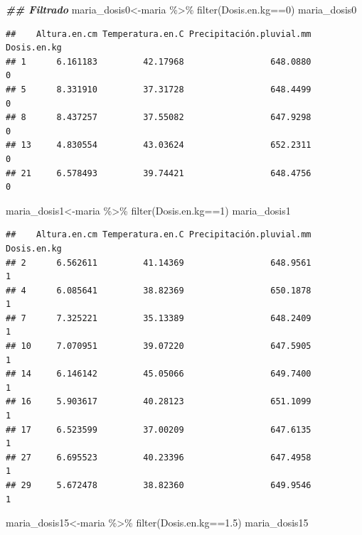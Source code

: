 \documentclass[
]{article}
\newenvironment{Shaded}{\begin{snugshade}}{\end{snugshade}}
\newcommand{\DecValTok}[1]{\textcolor[rgb]{0.00,0.00,0.81}{#1}}
\newcommand{\DocumentationTok}[1]{\textcolor[rgb]{0.56,0.35,0.01}{\textbf{\textit{#1}}}}
\newcommand{\FloatTok}[1]{\textcolor[rgb]{0.00,0.00,0.81}{#1}}
\newcommand{\FunctionTok}[1]{\textcolor[rgb]{0.00,0.00,0.00}{#1}}
\newcommand{\NormalTok}[1]{#1}
\newcommand{\OtherTok}[1]{\textcolor[rgb]{0.56,0.35,0.01}{#1}}
\newcommand{\SpecialCharTok}[1]{\textcolor[rgb]{0.00,0.00,0.00}{#1}}
\begin{document}
\begin{Shaded}
\begin{Highlighting}[]
\DocumentationTok{\#\# Filtrado}
\NormalTok{maria\_dosis0}\OtherTok{\textless{}{-}}\NormalTok{maria }\SpecialCharTok{\%\textgreater{}\%} \FunctionTok{filter}\NormalTok{(Dosis.en.kg}\SpecialCharTok{==}\DecValTok{0}\NormalTok{)}
\NormalTok{maria\_dosis0}
\end{Highlighting}
\end{Shaded}

\begin{verbatim}
##    Altura.en.cm Temperatura.en.C Precipitación.pluvial.mm Dosis.en.kg
## 1      6.161183         42.17968                 648.0880           0
## 5      8.331910         37.31728                 648.4499           0
## 8      8.437257         37.55082                 647.9298           0
## 13     4.830554         43.03624                 652.2311           0
## 21     6.578493         39.74421                 648.4756           0
\end{verbatim}

\begin{Shaded}
\begin{Highlighting}[]
\NormalTok{maria\_dosis1}\OtherTok{\textless{}{-}}\NormalTok{maria }\SpecialCharTok{\%\textgreater{}\%} \FunctionTok{filter}\NormalTok{(Dosis.en.kg}\SpecialCharTok{==}\DecValTok{1}\NormalTok{)}
\NormalTok{maria\_dosis1}
\end{Highlighting}
\end{Shaded}

\begin{verbatim}
##    Altura.en.cm Temperatura.en.C Precipitación.pluvial.mm Dosis.en.kg
## 2      6.562611         41.14369                 648.9561           1
## 4      6.085641         38.82369                 650.1878           1
## 7      7.325221         35.13389                 648.2409           1
## 10     7.070951         39.07220                 647.5905           1
## 14     6.146142         45.05066                 649.7400           1
## 16     5.903617         40.28123                 651.1099           1
## 17     6.523599         37.00209                 647.6135           1
## 27     6.695523         40.23396                 647.4958           1
## 29     5.672478         38.82360                 649.9546           1
\end{verbatim}

\begin{Shaded}
\begin{Highlighting}[]
\NormalTok{maria\_dosis15}\OtherTok{\textless{}{-}}\NormalTok{maria }\SpecialCharTok{\%\textgreater{}\%} \FunctionTok{filter}\NormalTok{(Dosis.en.kg}\SpecialCharTok{==}\FloatTok{1.5}\NormalTok{)}
\NormalTok{maria\_dosis15}
\end{Highlighting}
\end{Shaded}
\end{document}
